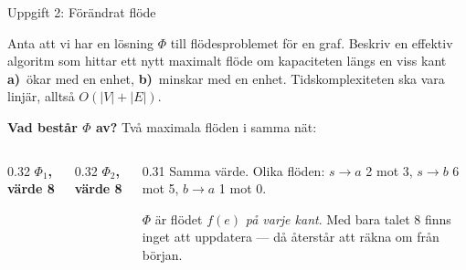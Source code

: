 \begin{frame}{Uppgift 2: Förändrat flöde}
\begin{infobox}
Anta att vi har en lösning $\Phi$ till flödesproblemet för en graf. Beskriv en effektiv algoritm
som hittar ett nytt maximalt flöde om kapaciteten längs en viss kant \textbf{a)}~ökar med en enhet,
\textbf{b)}~minskar med en enhet. Tidskomplexiteten ska vara linjär, alltså $O(|V|+|E|)$.
\end{infobox}
{\small\textbf{Vad består $\Phi$ av?} Två maximala flöden i samma nät:}\par
\begin{columns}[T]
\begin{column}{0.32\textwidth}
\centering
{\footnotesize\bfseries\color{kthnavy}$\Phi_1$, värde 8}\par

\end{column}
\begin{column}{0.32\textwidth}
\centering
{\footnotesize\bfseries\color{kthnavy}$\Phi_2$, värde 8}\par

\end{column}
\begin{column}{0.31\textwidth}
\footnotesize
Samma värde. Olika flöden: $s{\to}a$ 2 mot 3, $s{\to}b$ 6 mot 5, $b{\to}a$ 1 mot 0.\par\smallskip
$\Phi$ är flödet $f(e)$ \emph{på varje kant}. Med bara talet 8 finns inget att uppdatera — då
återstår att räkna om från början.
\end{column}
\end{columns}
\end{frame}

